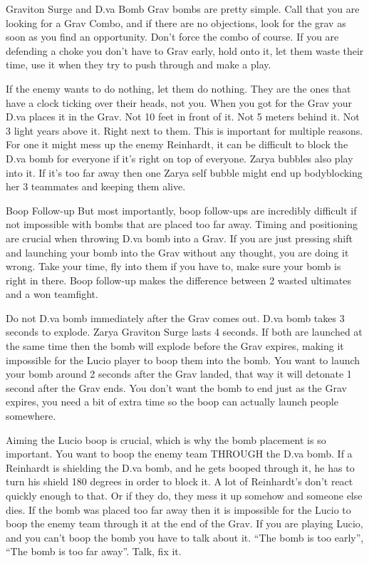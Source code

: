 Graviton Surge and D.va Bomb
Grav bombs are pretty simple. Call that you are looking for a Grav Combo, and if there are no objections, look for the grav as soon as you find an opportunity. Don’t force the combo of course. If you are defending a choke you don’t have to Grav early, hold onto it, let them waste their time, use it when they try to push through and make a play.
 
If the enemy wants to do nothing, let them do nothing. They are the ones that have a clock ticking over their heads, not you. When you got for the Grav your D.va places it in the Grav. Not 10 feet in front of it. Not 5 meters behind it. Not 3 light years above it. Right next to them. This is important for multiple reasons. For one it might mess up the enemy Reinhardt, it can be difficult to block the D.va bomb for everyone if it's right on top of everyone. Zarya bubbles also play into it. If it’s too far away then one Zarya self bubble might end up bodyblocking her 3 teammates and keeping them alive.

Boop Follow-up
But most importantly, boop follow-ups are incredibly difficult if not impossible with bombs that are placed too far away. Timing and positioning are crucial when throwing D.va bomb into a Grav. If you are just pressing shift and launching your bomb into the Grav without any thought, you are doing it wrong. Take your time, fly into them if you have to, make sure your bomb is right in there. Boop follow-up makes the difference between 2 wasted ultimates and a won teamfight.

Do not D.va bomb immediately after the Grav comes out. D.va bomb takes 3 seconds to explode. Zarya Graviton Surge lasts 4 seconds. If both are launched at the same time then the bomb will explode before the Grav expires, making it impossible for the Lucio player to boop them into the bomb. You want to launch your bomb around 2 seconds after the Grav landed, that way it will detonate 1 second after the Grav ends. You don’t want the bomb to end just as the Grav expires, you need a bit of extra time so the boop can actually launch people somewhere.

Aiming the Lucio boop is crucial, which is why the bomb placement is so important. You want to boop the enemy team THROUGH the D.va bomb. If a Reinhardt is shielding the D.va bomb, and he gets booped through it, he has to turn his shield 180 degrees in order to block it. A lot of Reinhardt's don’t react quickly enough to that. Or if they do, they mess it up somehow and someone else dies. If the bomb was placed too far away then it is impossible for the Lucio to boop the enemy team through it at the end of the Grav. If you are playing Lucio, and you can’t boop the bomb you have to talk about it. “The bomb is too early”, “The bomb is too far away”. Talk, fix it. 

